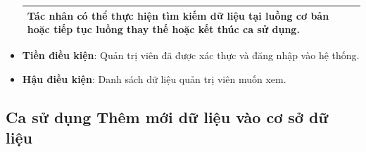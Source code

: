 \documentclass[./../main.tex]{subfiles}
\begin{document}
\begin{itemize}
\begin{table}[H]
\begin{tabularx}{\textwidth}{| X | X | X |}
            \\ \hline
            Tác nhân có thể thực hiện tìm kiếm dữ liệu tại luồng cơ bản hoặc tiếp tục luồng thay thế hoặc kết thúc ca sử dụng. &  &
            \\ \hline
        \end{tabularx}
        \end{table}
    \item \textbf{Tiền điều kiện}: Quản trị viên đã được xác thực và đăng nhập vào hệ thống.
    \item \textbf{Hậu điều kiện}: Danh sách dữ liệu quản trị viên muốn xem.
\end{itemize}

\subsection{Ca sử dụng Thêm mới dữ liệu vào cơ sở dữ liệu}
\end{document}
